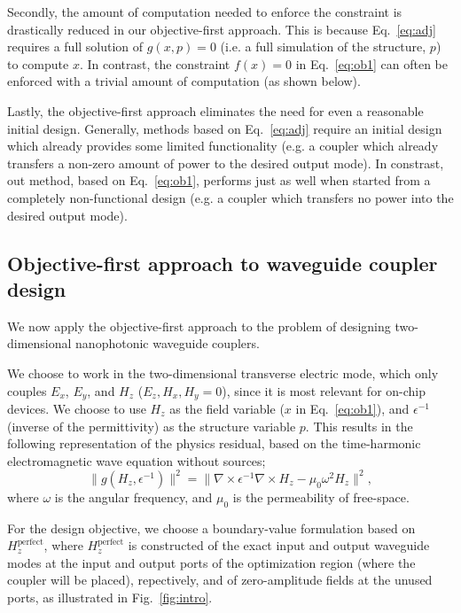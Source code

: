 \documentclass[letterpaper,10pt]{article}
\begin{document}
Secondly, the amount of computation needed to enforce the constraint is
    drastically reduced in our objective-first approach.
This is because Eq.~\ref{eq:adj} requires a full solution of $g(x,p)=0$
    (i.e. a full simulation of the structure, $p$) to compute $x$.
In contrast, the constraint $f(x)=0$ in Eq.~\ref{eq:ob1} 
    can often be enforced with a trivial amount of computation (as shown below).

Lastly, the objective-first approach eliminates the need for even a reasonable
    initial design.
Generally, methods based on Eq.~\ref{eq:adj} require an initial design which
    already provides some limited functionality
    (e.g. a coupler which already transfers 
    a non-zero amount of power to the desired output mode).
In constrast, out method, based on Eq.~\ref{eq:ob1}, performs just as well
    when started from a completely non-functional design 
    (e.g. a coupler which transfers no power into the desired output mode).

\subsection{Objective-first approach to waveguide coupler design}
We now apply the objective-first approach to the problem of designing 
    two-dimensional nanophotonic waveguide couplers.

We choose to work in the two-dimensional transverse electric mode,
    which only couples $E_x$, $E_y$, and $H_z$ ($E_z, H_x, H_y = 0$),
    since it is most relevant for on-chip devices.
We choose to use $H_z$ as the field variable ($x$ in Eq.~\ref{eq:ob1}), 
    and $\epsilon^{-1}$ (inverse of the permittivity) 
    as the structure variable $p$.
This results in the following representation of the physics residual, 
    based on the time-harmonic electromagnetic wave equation without sources;
    \begin{equation}
    \|g(H_z, \epsilon^{-1})\|^2 = 
    \| \nabla \times \epsilon^{-1} \nabla \times H_z - \mu_0 \omega^2 H_z \|^2,
    \end{equation}
    where $\omega$ is the angular frequency,
    and $\mu_0$ is the permeability of free-space.

For the design objective, we choose a boundary-value formulation
    based on $H_z^\text{perfect}$,
    where $H_z^\text{perfect}$ is constructed 
    of the exact input and output waveguide modes at the input and output ports
    of the optimization region (where the coupler will be placed),
    repectively, and of zero-amplitude fields at the unused ports, 
    as illustrated in Fig.~\ref{fig:intro}.
\end{document}
